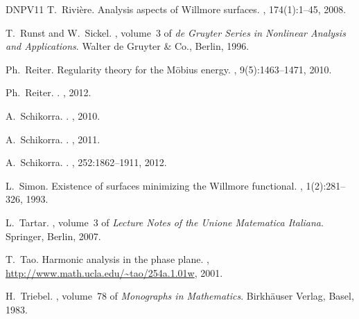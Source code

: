 \begin{thebibliography}{DNPV11}
T.~Rivi{\`e}re.
\newblock Analysis aspects of {W}illmore surfaces.
, 174(1):1--45, 2008.

T.~Runst and W.~Sickel.
, volume~3 of {\em de Gruyter Series
  in Nonlinear Analysis and Applications}.
\newblock Walter de Gruyter \& Co., Berlin, 1996.

Ph.~Reiter.
\newblock Regularity theory for the {M}\"obius energy.
, 9(5):1463--1471, 2010.

Ph.~Reiter.
.
, 2012.

A.~Schikorra.
.
, 2010.

A.~Schikorra.
.
, 2011.

A.~Schikorra.
.
, 252:1862--1911, 2012.

L.~Simon.
\newblock Existence of surfaces minimizing the {W}illmore functional.
, 1(2):281--326, 1993.

L.~Tartar.
,
  volume~3 of {\em Lecture Notes of the Unione Matematica Italiana}.
\newblock Springer, Berlin, 2007.

T.~Tao.
\newblock Harmonic analysis in the phase plane.
, \url{http://www.math.ucla.edu/~tao/254a.1.01w}, 2001.

H.~Triebel.
, volume~78 of {\em Monographs in
  Mathematics}.
\newblock Birkh\"auser Verlag, Basel, 1983.

\end{thebibliography}

